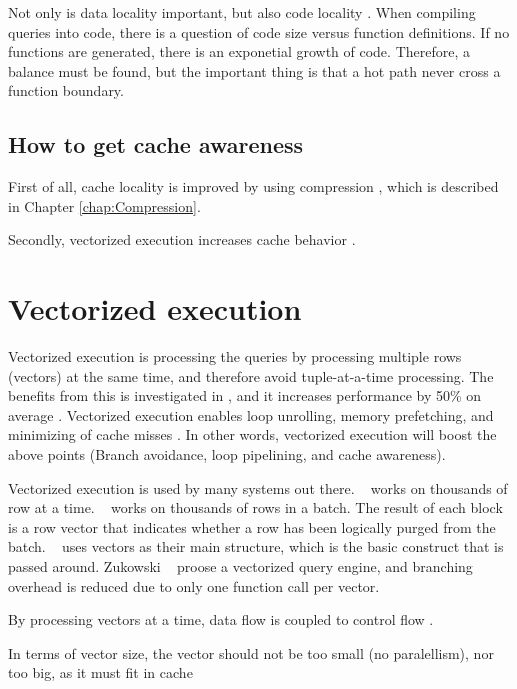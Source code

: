 Not only is data locality important, but also code locality \cite{Neumann2011-uq}. When compiling queries into code, there is a question of code size versus function definitions. If no functions are generated, there is an exponetial growth of code. Therefore, a balance must be found, but the important thing is that a hot path never cross a function boundary.

\subsection{How to get cache awareness}
\label{sub:How to get cache awareness}
First of all, cache locality is improved by using compression \cite{Lemke2010-is}, which is described in Chapter \ref{chap:Compression}.

Secondly, vectorized execution increases cache behavior \cite{Larson2013-mc}.

\section{Vectorized execution}
\label{sec:Vectorized execution}
Vectorized execution is processing the queries by processing multiple rows (vectors) at the same time, and therefore avoid tuple-at-a-time processing. The benefits from this is investigated in \cite{Abadi2008-dd}, and it increases performance by 50\% on average . Vectorized execution enables loop unrolling, memory prefetching, and minimizing of cache misses \cite{Larson2013-mc}. In other words, vectorized execution will boost the above points (Branch avoidance, loop pipelining, and cache awareness).

Vectorized execution is used by many systems out there. \ibm~\cite{Raman2013-em} works on thousands of row at a time. \mssql~\cite{Larson2013-mc} works on thousands of rows in a batch. The result of each block is a row vector that indicates whether a row has been logically purged from the batch. \monetx~\cite{Boncz2005-wj} uses vectors as their main structure, which is the basic construct that is passed around. Zukowski \ea~\cite{Zukowski2006-oz} proose a vectorized query engine, and branching overhead is reduced due to only one function call per vector.

By processing vectors at a time, data flow is coupled to control flow \cite{Stonebraker2005-qz, Lamb2012-kg}.

In terms of vector size, the vector should not be too small (no paralellism), nor too big, as it must fit in cache \cite{Boncz2005-wj}

